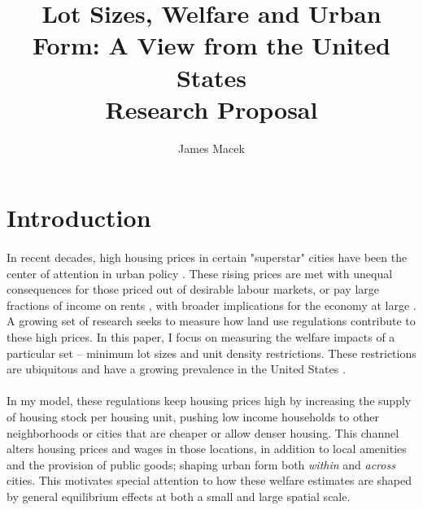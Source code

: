 \documentclass[]{article}
\title{Lot Sizes, Welfare and Urban Form: A View from the United States \\
Research Proposal}
\author{James Macek}
\begin{document}
\maketitle

\begin{abstract} 
\end{abstract}

\section{Introduction}
\paragraph*{}
In recent decades, high housing prices in certain "superstar" cities have been the center of attention in urban policy \citep{superstarcities}. These rising prices are met with unequal consequences for those priced out of desirable labour markets, or pay large fractions of income on rents \citep{nonhomo}, with broader implications for the economy at large \citep{hseihmoretti} \citep{parkho}. A growing set of research seeks to measure how land use regulations contribute to these high prices. In this paper, I focus on measuring the welfare impacts of a particular set -- minimum lot sizes and unit density restrictions. These restrictions are ubiquitous and have a growing prevalence in the United States \citep{gyourko2021}.  
\paragraph*{}

 In my model, these regulations keep housing prices high by increasing the supply of housing stock per housing unit, pushing low income  households to other neighborhoods or cities that are cheaper or allow denser housing. This channel alters housing prices and wages in those locations, in addition to local amenities and the provision of public goods; shaping urban form both \textit{within} and \textit{across} cities. This motivates special attention to how these welfare estimates are shaped by general equilibrium effects at both a small and large spatial scale.
\end{document}
